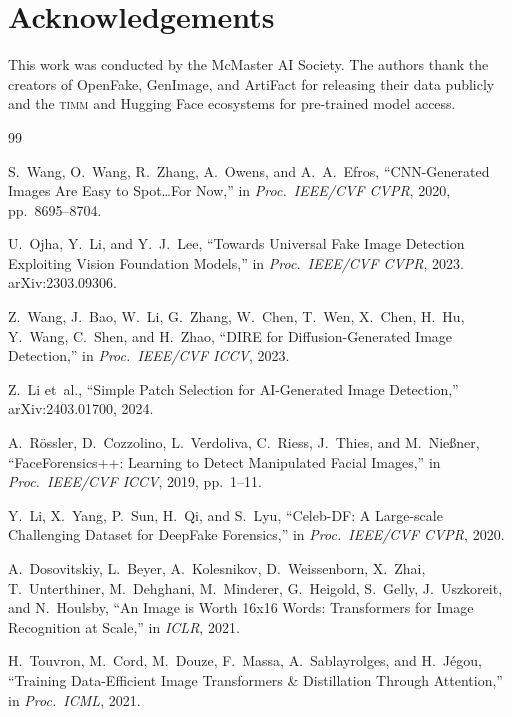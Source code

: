 \documentclass[12pt, a4paper]{article}
\begin{document}
\section*{Acknowledgements}

This work was conducted by the McMaster AI Society.  The authors thank the
creators of OpenFake, GenImage, and ArtiFact for releasing their data publicly
and the \textsc{timm} and Hugging Face ecosystems for pre-trained model access.



\begin{thebibliography}{99}

S.~Wang, O.~Wang, R.~Zhang, A.~Owens, and A.~A.~Efros,
``CNN-Generated Images Are Easy to Spot\ldots For Now,''
in \textit{Proc.\ IEEE/CVF CVPR}, 2020, pp.\ 8695--8704.

U.~Ojha, Y.~Li, and Y.~J.~Lee,
``Towards Universal Fake Image Detection Exploiting Vision Foundation Models,''
in \textit{Proc.\ IEEE/CVF CVPR}, 2023.
arXiv:2303.09306.

Z.~Wang, J.~Bao, W.~Li, G.~Zhang, W.~Chen, T.~Wen, X.~Chen, H.~Hu, Y.~Wang,
C.~Shen, and H.~Zhao,
``DIRE for Diffusion-Generated Image Detection,''
in \textit{Proc.\ IEEE/CVF ICCV}, 2023.

Z.~Li et~al.,
``Simple Patch Selection for AI-Generated Image Detection,''
arXiv:2403.01700, 2024.

A.~R{\"o}ssler, D.~Cozzolino, L.~Verdoliva, C.~Riess, J.~Thies, and
M.~Nie{\ss}ner,
``FaceForensics++: Learning to Detect Manipulated Facial Images,''
in \textit{Proc.\ IEEE/CVF ICCV}, 2019, pp.\ 1--11.

Y.~Li, X.~Yang, P.~Sun, H.~Qi, and S.~Lyu,
``Celeb-DF: A Large-scale Challenging Dataset for DeepFake Forensics,''
in \textit{Proc.\ IEEE/CVF CVPR}, 2020.

A.~Dosovitskiy, L.~Beyer, A.~Kolesnikov, D.~Weissenborn, X.~Zhai,
T.~Unterthiner, M.~Dehghani, M.~Minderer, G.~Heigold, S.~Gelly, J.~Uszkoreit,
and N.~Houlsby,
``An Image is Worth 16x16 Words: Transformers for Image Recognition at Scale,''
in \textit{ICLR}, 2021.

H.~Touvron, M.~Cord, M.~Douze, F.~Massa, A.~Sablayrolges, and
H.~J{\'e}gou,
``Training Data-Efficient Image Transformers \& Distillation Through Attention,''
in \textit{Proc.\ ICML}, 2021.


\end{thebibliography}
\end{document}
